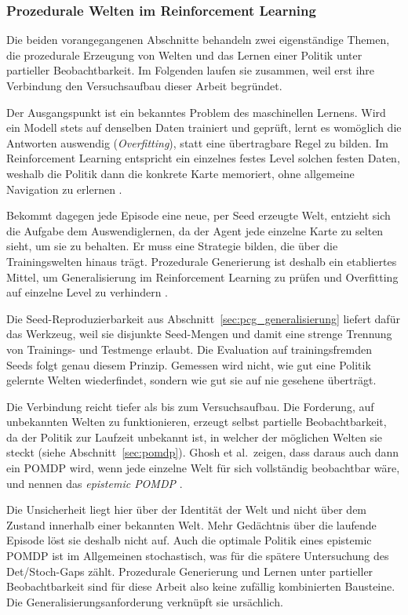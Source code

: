 \documentclass[11pt,a4paper]{article}
\begin{document}
\subsubsection{Prozedurale Welten im Reinforcement Learning}
\label{sec:g_bridge}

Die beiden vorangegangenen Abschnitte behandeln zwei eigenständige Themen, die
prozedurale Erzeugung von Welten und das Lernen einer Politik unter partieller
Beobachtbarkeit. Im Folgenden laufen sie zusammen, weil erst ihre Verbindung
den Versuchsaufbau dieser Arbeit begründet.

Der Ausgangspunkt ist ein bekanntes Problem des maschinellen Lernens. Wird ein
Modell stets auf denselben Daten trainiert und geprüft, lernt es womöglich die
Antworten auswendig (\emph{Overfitting}), statt eine übertragbare Regel zu
bilden. Im Reinforcement Learning entspricht ein einzelnes festes Level solchen
festen Daten, weshalb die Politik dann die konkrete Karte memoriert, ohne
allgemeine Navigation zu erlernen \cite{cobbe2020procgen, kirk2023survey}.

Bekommt dagegen jede Episode eine neue, per Seed erzeugte Welt, entzieht sich
die Aufgabe dem Auswendiglernen, da der Agent jede einzelne Karte zu selten
sieht, um sie zu behalten. Er muss eine Strategie bilden, die über die
Trainingswelten hinaus trägt. Prozedurale Generierung ist deshalb ein
etabliertes Mittel, um Generalisierung im Reinforcement Learning zu prüfen und
Overfitting auf einzelne Level zu verhindern \cite{cobbe2020procgen,
risi2020increasing}.

Die Seed-Reproduzierbarkeit aus Abschnitt~\ref{sec:pcg_generalisierung} liefert
dafür das Werkzeug, weil sie disjunkte Seed-Mengen und damit eine strenge
Trennung von Trainings- und Testmenge erlaubt. Die Evaluation auf
trainingsfremden Seeds folgt genau diesem Prinzip. Gemessen wird nicht, wie gut
eine Politik gelernte Welten wiederfindet, sondern wie gut sie auf nie gesehene
überträgt.

Die Verbindung reicht tiefer als bis zum Versuchsaufbau. Die Forderung, auf
unbekannten Welten zu funktionieren, erzeugt selbst partielle Beobachtbarkeit,
da der Politik zur Laufzeit unbekannt ist, in welcher der möglichen Welten sie
steckt (siehe Abschnitt~\ref{sec:pomdp}). Ghosh et al.\ zeigen, dass daraus
auch dann ein POMDP wird, wenn jede einzelne Welt für sich vollständig
beobachtbar wäre, und nennen das \emph{epistemic POMDP}
\cite{ghosh2021epistemic}.

Die Unsicherheit liegt hier über der Identität der Welt und nicht über dem
Zustand innerhalb einer bekannten Welt. Mehr Gedächtnis über die laufende
Episode löst sie deshalb nicht auf. Auch die optimale Politik eines epistemic
POMDP ist im Allgemeinen stochastisch, was für die spätere Untersuchung des
Det/Stoch-Gaps zählt. Prozedurale
Generierung und Lernen unter partieller Beobachtbarkeit sind für diese Arbeit
also keine zufällig kombinierten Bausteine. Die Generalisierungsanforderung
verknüpft sie ursächlich.
\end{document}
